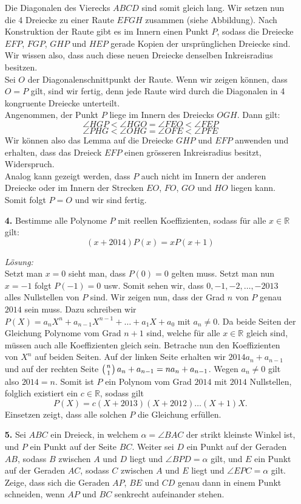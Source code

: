 \documentclass[12pt,a4paper]{article}
\theoremstyle{plain}
\theoremstyle{definition}
\theoremstyle{remark}
\renewcommand{\binom}[2]{\left({#1}\atop{#2}\right)}
\begin{document}
\begin{enumerate}
Die Diagonalen des Vierecks $ABCD$ sind somit gleich lang. Wir setzen nun die 4 Dreiecke zu einer Raute $EFGH$ zusammen (siehe Abbildung). Nach Konstruktion der Raute gibt es im Innern einen Punkt $P$, sodass die Dreiecke $EFP$, $FGP$, $GHP$ und $HEP$ gerade Kopien der ursprünglichen Dreiecke sind. Wir wissen also, dass auch diese neuen Dreiecke denselben Inkreisradius besitzen.\\
Sei $O$ der Diagonalenschnittpunkt der Raute. Wenn wir zeigen können, dass $O=P$ gilt, sind wir fertig, denn jede Raute wird durch die Diagonalen in 4 kongruente Dreiecke unterteilt.\\
Angenommen, der Punkt $P$ liege im Innern des Dreiecks $OGH$. Dann gilt:
\[
\angle HGP<\angle HGO=\angle FEO<\angle FEP
\]
\[
\angle PHG<\angle OHG=\angle OFE<\angle PFE
\]
Wir können also das Lemma auf die Dreiecke $GHP$ und $EFP$ anwenden und erhalten, dass das Dreieck $EFP$ einen grösseren Inkreisradius besitzt, Widerspruch.\\
Analog kann gezeigt werden, dass $P$ auch nicht im Innern der anderen Dreiecke oder im Innern der Strecken $EO$, $FO$, $GO$ und $HO$ liegen kann. Somit folgt $P=O$ und wir sind fertig.
	
	
	\item[\textbf{4.}] Bestimme alle Polynome $P$ mit reellen Koeffizienten, sodass für alle $x \in\mathbb{R}$ gilt:
\[(x+2014)P(x)=xP(x+1)\]

\textit{Lösung:}\\
Setzt man $x=0$ sieht man, dass $P(0)=0$ gelten muss. Setzt man nun $x=-1$ folgt $P(-1)=0$ usw. Somit sehen wir, dass $0,-1,-2,\dots,-2013$ alles Nullstellen von $P$ sind. Wir zeigen nun, dass der Grad $n$ von $P$ genau $2014$ sein muss. Dazu schreiben wir $P(X) = a_nX^{n}+a_{n-1}X^{n-1}+\dots+a_1X+a_0$ mit $a_n \neq 0.$ Da beide Seiten der Gleichung Polynome vom Grad $n+1$ sind, welche für alle $x\in \mathbb{R}$ gleich sind, müssen auch alle Koeffizienten gleich sein. Betrache nun den Koeffizienten von $X^n$ auf beiden Seiten. Auf der linken Seite erhalten wir $2014a_{n}+a_{n-1}$ und auf der rechten Seite $\binom{n}{1}a_n+a_{n-1}=na_n+a_{n-1}$. Wegen $a_n\neq 0$ gilt also $2014 =n$. Somit ist $P$ ein Polynom vom Grad $2014$ mit $2014$ Nullstellen, folglich existiert ein $c \in \mathbb{R}$, sodass gilt
\[
P(X)=c(X+2013)(X+2012)\dots(X+1)X.
\]
Einsetzen zeigt, dass alle solchen $P$ die Gleichung erfüllen.
	
    \item[\textbf{5.}] Sei $ABC$ ein Dreieck, in welchem $\alpha=\angle BAC$ der strikt kleinste Winkel ist, und $P$ ein Punkt auf der Seite $BC$. Weiter sei $D$ ein Punkt auf der Geraden $AB$, sodass $B$ zwischen $A$ und $D$ liegt und $\angle BPD=\alpha$ gilt, und $E$ ein Punkt auf der Geraden $AC$, sodass $C$ zwischen $A$ und $E$ liegt und $\angle EPC=\alpha$ gilt. Zeige, dass sich die Geraden $AP$, $BE$ und $CD$ genau dann in einem Punkt schneiden, wenn $AP$ und $BC$ senkrecht aufeinander stehen.\\


\end{enumerate}
\end{document}
